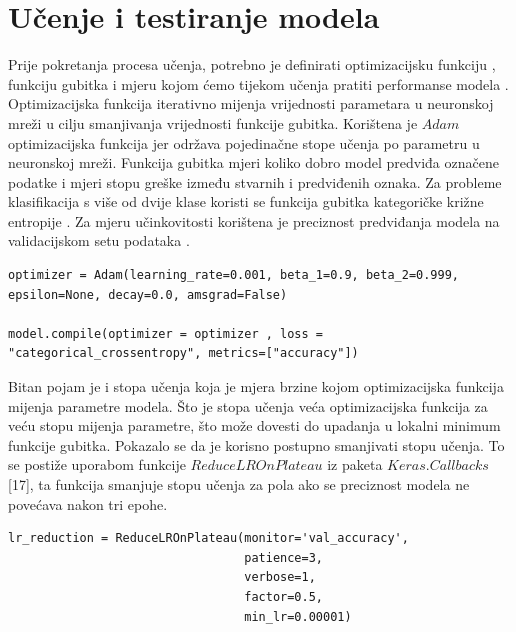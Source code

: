 \documentclass[times, utf8, zavrsni]{fer}
\begin{document}
\section{Učenje i testiranje modela}

Prije pokretanja procesa učenja, potrebno je definirati optimizacijsku funkciju , funkciju gubitka  i mjeru kojom ćemo tijekom učenja pratiti performanse modela . Optimizacijska funkcija iterativno mijenja vrijednosti parametara u neuronskoj mreži u cilju smanjivanja vrijednosti funkcije gubitka. Korištena je $Adam$ optimizacijska funkcija jer održava pojedinačne stope učenja po parametru u neuronskoj mreži. Funkcija gubitka mjeri koliko dobro model predviđa označene podatke i mjeri stopu greške između stvarnih i predviđenih oznaka. Za probleme klasifikacija s više od dvije klase koristi se funkcija gubitka kategoričke križne entropije . Za mjeru učinkovitosti korištena je preciznost predviđanja modela na validacijskom setu podataka . 

\begin{verbatim}
optimizer = Adam(learning_rate=0.001, beta_1=0.9, beta_2=0.999, epsilon=None, decay=0.0, amsgrad=False)

model.compile(optimizer = optimizer , loss = "categorical_crossentropy", metrics=["accuracy"])
\end{verbatim}

Bitan pojam je i stopa učenja  koja je mjera brzine kojom optimizacijska funkcija mijenja parametre modela. Što je stopa učenja veća optimizacijska funkcija za veću stopu mijenja parametre, što može dovesti do upadanja u lokalni minimum funkcije gubitka. Pokazalo se da je korisno postupno smanjivati stopu učenja. To se postiže uporabom funkcije $ReduceLROnPlateau$ iz paketa $Keras.Callbacks$ [17], ta funkcija smanjuje stopu učenja za pola ako se preciznost modela ne povećava nakon tri epohe. 

\begin{verbatim}
lr_reduction = ReduceLROnPlateau(monitor='val_accuracy', 
                                 patience=3, 
                                 verbose=1, 
                                 factor=0.5, 
                                 min_lr=0.00001)
\end{verbatim}
\end{document}
